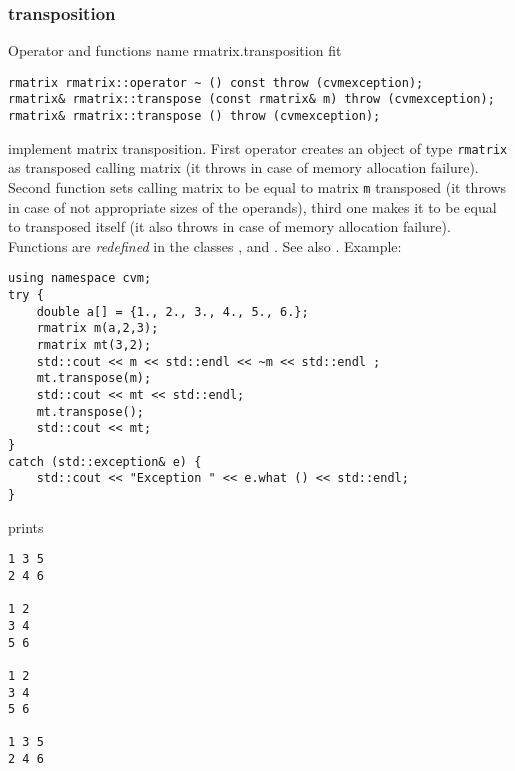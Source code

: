 \subsubsection{transposition}
Operator and functions%
\pdfdest name {rmatrix.transposition} fit
\begin{verbatim}
rmatrix rmatrix::operator ~ () const throw (cvmexception);
rmatrix& rmatrix::transpose (const rmatrix& m) throw (cvmexception);
rmatrix& rmatrix::transpose () throw (cvmexception);
\end{verbatim}
implement matrix transposition.
First operator creates an object of type \verb"rmatrix" as
 transposed calling matrix
(it throws 
in case of memory allocation failure).
Second function sets  calling matrix to be equal to  matrix
\verb"m" transposed
(it throws 
in case of not appropriate sizes of the operands),
third one makes it to be equal to
transposed itself (it also throws 
in case of memory allocation failure).
Functions are \emph{redefined} in the classes
, 
and .
See also .
Example:
\begin{Verbatim}
using namespace cvm;
try {
    double a[] = {1., 2., 3., 4., 5., 6.};
    rmatrix m(a,2,3);
    rmatrix mt(3,2);
    std::cout << m << std::endl << ~m << std::endl ;
    mt.transpose(m);
    std::cout << mt << std::endl;
    mt.transpose();
    std::cout << mt;
}
catch (std::exception& e) {
    std::cout << "Exception " << e.what () << std::endl;
}
\end{Verbatim}
prints
\begin{Verbatim}
1 3 5
2 4 6

1 2
3 4
5 6

1 2
3 4
5 6

1 3 5
2 4 6
\end{Verbatim}
\newpage





